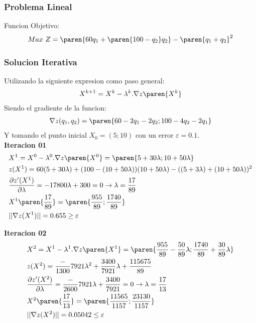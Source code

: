 \begin{homeworkProblem}

\subsubsection{Problema Lineal}
Funcion Objetivo:
\begin{align*}
    Max\ Z = \paren{60q_1+\paren{100-q_2}q_2} - \paren{q_1+q_2}^2
\end{align*}
\subsubsection{Solucion Iterativa}

Utilizando la siguiente expresion como paso general:
\begin{align*}
    X^{k+1}=X^k-\lambda^k.\nabla z\paren{X^k}
\end{align*} 
Siendo el gradiente de la funcion:
\begin{align*}
    \nabla z(q_1,q_2)=\paren{60-2q_1-2q_2;100-4q_2-2q_1}
\end{align*}
Y tomando el punto inicial $X_0=(5;10)$ con un error $\varepsilon=0.1$.\\

\textbf{Iteracion 01}\\
\begin{align*}
    &X^{1}=X^0-\lambda^0.\nabla z\paren{X^0}=\paren{5+30\lambda;10+50\lambda}\\
    &z(X^1)=60(5+30\lambda)+(100-(10+50\lambda))(10+50\lambda)-((5+3\lambda)+(10+50\lambda))^2 \\
    &\frac{\partial z'(X^1) }{\partial \lambda}=
        -17800\lambda +300 = 0 
        \rightarrow \lambda = \frac{17}{89}\\
    &X^1\paren{\frac{17}{89}}=\paren{\frac{955}{89};\frac{1740}{89}}\\
    &||\nabla z(X^1)|| = 0.655 \geq \varepsilon
\end{align*}

\textbf{Iteracion 02}\\
\begin{align*}
    &X^{2}=X^1-\lambda^1.\nabla z\paren{X^1}=\paren{\frac{955}{89}-\frac{50}{89}\lambda;\frac{1740}{89}+\frac{30}{89}\lambda}\\
    &z(X^2)=\frac-{1300}{7921}\lambda^2+\frac{3400}{7921}\lambda+\frac{115675}{89} \\
    &\frac{\partial z'(X^2) }{\partial \lambda}=
        \frac-{2600}{7921}\lambda+\frac{3400}{7921}= 0 
        \rightarrow \lambda = \frac{17}{13}\\
    &X^2\paren{\frac{17}{13}}=\paren{\frac{11565}{1157};\frac{23130}{1157}}\\
    &||\nabla z(X^2)|| = 0.05042 \leq \varepsilon
\end{align*}


\end{homeworkProblem}
